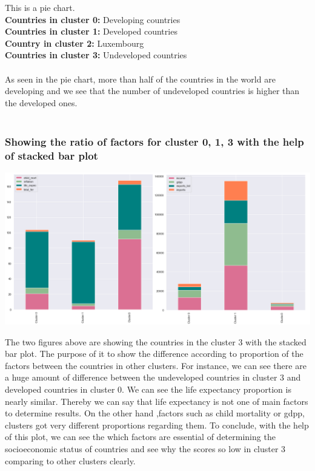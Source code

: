 \documentclass[onecolumn]{article}
\begin{document}
This is a pie chart.\\
\textbf{Countries in cluster 0:} Developing countries\\ 
\textbf{Countries in cluster 1:} Developed countries\\
\textbf{Country in cluster 2:} Luxembourg\\
\textbf{Countries in cluster 3:} Undeveloped countries\\\\
As seen in the pie chart, more than half of the countries in the world are developing and we see that the number of undeveloped countries is higher than the developed ones.\\\\

\subsubsection{Showing the ratio of factors for cluster 0, 1, 3 with the help of stacked bar plot}
\begin{center}
    \includegraphics[scale=0.50]{stacked12.png}
\end{center}

\large
The two figures above are showing the countries in the cluster 3 with the stacked bar plot. The purpose of it to show the difference according to proportion of the factors between the countries in other clusters. For instance, we can see there are a huge amount of difference between the undeveloped countries in cluster 3 and developed countries in cluster 0. We can see the life expectancy proportion is nearly similar. Thereby we can say that life expectancy is not one of main factors to determine results. On the other hand ,factors such as child mortality or gdpp, clusters got very different proportions regarding them. To conclude, with the help of this plot, we can see the which factors are essential of determining the socioeconomic status of countries and see why the scores so low in cluster 3 comparing to other clusters clearly.
\end{document}
